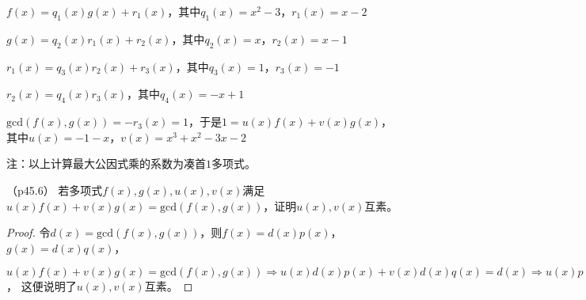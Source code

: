 \documentclass[12pt, a4paper, oneside, UTF8]{ctexbook}
\begin{document}
\begin{solution}
    $f(x)=q_1(x)g(x)+r_1(x)$，其中$q_1(x)=x^2-3$，$r_1(x)=x-2$

    $g(x)=q_2(x)r_1(x)+r_2(x)$，其中$q_2(x)=x$，$r_2(x)=x-1$

    $r_1(x)=q_3(x)r_2(x)+r_3(x)$，其中$q_3(x)=1$，$r_3(x)=-1$

    $r_2(x)=q_4(x)r_3(x)$，其中$q_4(x)=-x+1$

    $\mathrm{gcd}(f(x),g(x))=-r_3(x)=1$，于是$1=u(x)f(x)+v(x)g(x)$，
    其中$u(x)=-1-x$，$v(x)=x^3+x^2-3x-2$

    注：以上计算最大公因式乘的系数为凑首$1$多项式。

\end{solution}
    
\begin{question}（p45.6）
    若多项式$f(x),g(x),u(x),v(x)$满足$u(x)f(x)+v(x)g(x)=\mathrm{gcd}(f(x),g(x))$，证明$u(x),v(x)$互素。
\end{question}

\begin{proof}
    令$d(x)=\mathrm{gcd}(f(x),g(x))$，则$f(x)=d(x)p(x)$，$g(x)=d(x)q(x)$，
    
    $u(x)f(x)+v(x)g(x)=\mathrm{gcd}(f(x),g(x)) \Rightarrow 
    u(x)d(x)p(x)+v(x)d(x)q(x)=d(x) \Rightarrow u(x)p(x)+v(x)q(x)=1$，
    这便说明了$u(x),v(x)$互素。

\end{proof}

\ifx\allfiles\undefined
\end{document}
